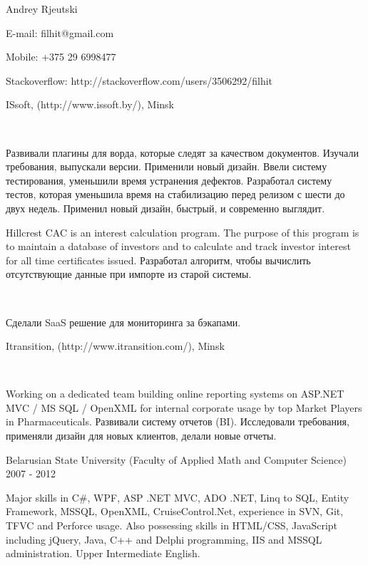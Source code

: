 \documentclass{article}
\begin{document}
Andrey Rjeutski

E-mail: filhit@gmail.com

Mobile: +375 29 6998477

Stackoverflow: http://stackoverflow.com/users/3506292/filhit

ISsoft, (http://www.issoft.by/), Minsk

\

Развивали плагины для ворда, которые следят за качеством документов.
Изучали требования, выпускали версии.
Применили новый дизайн. Ввели систему тестирования, уменьшили время устранения дефектов.
Разработал систему тестов, которая уменьшила время на стабилизацию перед релизом с шести до двух недель.
Применил новый дизайн, быстрый, и современно выглядит.


Hillcrest CAC is an interest calculation program.
The purpose of this program is to maintain a database of investors and to calculate and track investor interest for all time certificates issued.
Разработал алгоритм, чтобы вычислить отсутствующие данные при импорте из старой системы.

\

Сделали SaaS решение для мониторинга за бэкапами.

Itransition, (http://www.itransition.com/), Minsk

\

Working on a dedicated team building online reporting systems on ASP.NET MVC / MS SQL / OpenXML for internal corporate usage by top Market Players in Pharmaceuticals.
Развивали систему отчетов (BI). 
Исследовали требования, применяли дизайн для новых клиентов, делали новые отчеты.

Belarusian State University (Faculty of Applied Math and Computer Science) 2007 - 2012

Major skills in C\#, WPF, ASP .NET MVC, ADO .NET, Linq to SQL, Entity Framework, MSSQL, OpenXML, CruiseControl.Net, experience in SVN, Git, TFVC and Perforce usage. 
Also possessing skills in HTML/CSS, JavaScript including jQuery, Java, C++ and Delphi programming, IIS and MSSQL administration.
Upper Intermediate English. 
\end{document}
